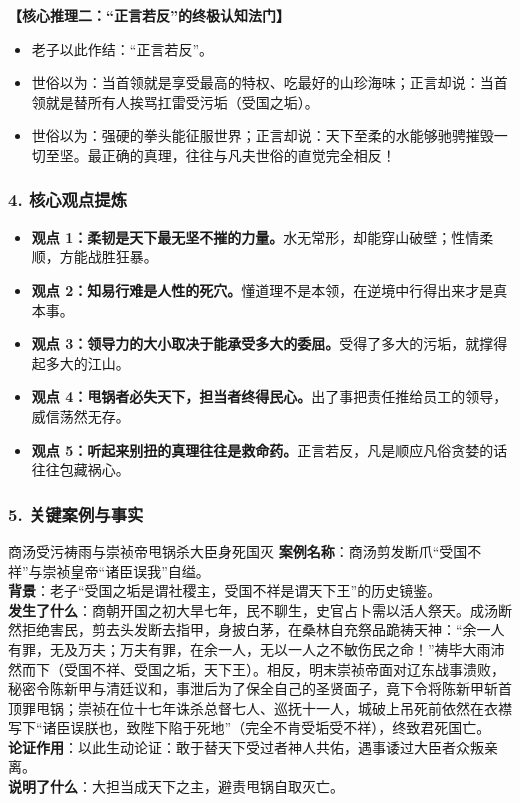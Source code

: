 \noindent\textbf{【核心推理二：“正言若反”的终极认知法门】}
\begin{itemize}
    \item 老子以此作结：“正言若反”。
    \item 世俗以为：当首领就是享受最高的特权、吃最好的山珍海味；正言却说：当首领就是替所有人挨骂扛雷受污垢（受国之垢）。
    \item 世俗以为：强硬的拳头能征服世界；正言却说：天下至柔的水能够驰骋摧毁一切至坚。最正确的真理，往往与凡夫世俗的直觉完全相反！
\end{itemize}

\subsubsection{4. 核心观点提炼}
\begin{itemize}
    \item \textbf{观点 1：柔韧是天下最无坚不摧的力量。}水无常形，却能穿山破壁；性情柔顺，方能战胜狂暴。
    \item \textbf{观点 2：知易行难是人性的死穴。}懂道理不是本领，在逆境中行得出来才是真本事。
    \item \textbf{观点 3：领导力的大小取决于能承受多大的委屈。}受得了多大的污垢，就撑得起多大的江山。
    \item \textbf{观点 4：甩锅者必失天下，担当者终得民心。}出了事把责任推给员工的领导，威信荡然无存。
    \item \textbf{观点 5：听起来别扭的真理往往是救命药。}正言若反，凡是顺应凡俗贪婪的话往往包藏祸心。
\end{itemize}

\subsubsection{5. 关键案例与事实}
\begin{CaseBox}{商汤受污祷雨与崇祯帝甩锅杀大臣身死国灭}
\textbf{案例名称}：商汤剪发断爪“受国不祥”与崇祯皇帝“诸臣误我”自缢。\\
\textbf{背景}：老子“受国之垢是谓社稷主，受国不祥是谓天下王”的历史镜鉴。\\
\textbf{发生了什么}：商朝开国之初大旱七年，民不聊生，史官占卜需以活人祭天。成汤断然拒绝害民，剪去头发断去指甲，身披白茅，在桑林自充祭品跪祷天神：“余一人有罪，无及万夫；万夫有罪，在余一人，无以一人之不敏伤民之命！”祷毕大雨沛然而下（受国不祥、受国之垢，天下王）。相反，明末崇祯帝面对辽东战事溃败，秘密令陈新甲与清廷议和，事泄后为了保全自己的圣贤面子，竟下令将陈新甲斩首顶罪甩锅；崇祯在位十七年诛杀总督七人、巡抚十一人，城破上吊死前依然在衣襟写下“诸臣误朕也，致陛下陷于死地”（完全不肯受垢受不祥），终致君死国亡。\\
\textbf{论证作用}：以此生动论证：敢于替天下受过者神人共佑，遇事诿过大臣者众叛亲离。\\
\textbf{说明了什么}：大担当成天下之主，避责甩锅自取灭亡。
\end{CaseBox}

